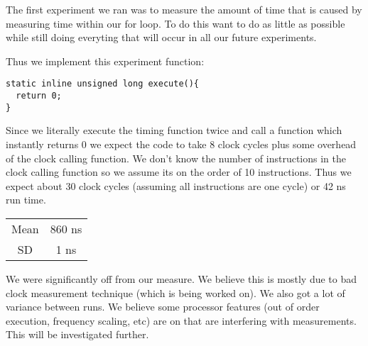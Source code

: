 The first experiment we ran was to measure the amount of time that is caused by measuring time within our for loop.
To do this want to do as little as possible while still doing everyting that will occur in all our future experiments.

Thus we implement this experiment function: 
\begin{verbatim}
static inline unsigned long execute(){
  return 0;
}
\end{verbatim}

Since we literally execute the timing function twice and call a function which instantly returns 0 we expect the code to take 8 clock cycles plus some overhead of the clock calling function.   We don't know the number of instructions in the clock calling function so we assume its on the order of 10 instructions.  Thus we expect about 30 clock cycles (assuming all instructions are one cycle) or 42 ns run time.

\begin{table}[h]
\centering
\begin{tabular}{|c|c|}\hline
Mean & 860 ns \\
SD & 1 ns\\\hline
\end{tabular}
\end{table}

We were significantly off from our measure.  We believe this is mostly due to bad clock measurement technique (which is being worked on).  We also got a lot of variance between runs.  We believe some processor features (out of order execution, frequency scaling, etc) are on that are interfering with measurements.  This will be investigated further.